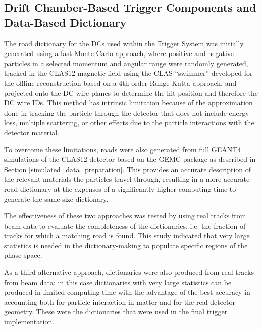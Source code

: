 
\subsection{Drift Chamber-Based Trigger Components and Data-Based Dictionary}
\label{dc_dictionary}

The road dictionary for the DCs used within the Trigger System was initially generated using a fast Monte Carlo approach, where positive and negative particles in a selected momentum and angular range were randomly generated, tracked in the CLAS12 magnetic field using the CLAS ``swimmer'' developed for the offline reconstruction based on a 4th-order Runge-Kutta approach, and projected onto the DC wire planes to determine the hit position and therefore the DC wire IDs. This method has intrinsic limitation because of the approximation done in tracking the particle through the detector that does not include energy loss, multiple scattering, or other effects due to the particle interactions with the detector material.

To overcome these limitations, roads were also generated from full GEANT4 simulations of the CLAS12 detector based on the GEMC package as described in Section \ref{simulated_data_preparation}. This provides an accurate description of the relevant materials the particles travel through, resulting in a more accurate road dictionary at the expenses of a significantly higher computing time to generate the same size dictionary.

The effectiveness of these two approaches was tested by using real tracks from beam data to evaluate the completeness of the dictionaries, i.e. the fraction of tracks for which a matching road is found. This study indicated that very large statistics is needed in the dictionary-making to populate specific regions of the phase space.

As a third alternative approach, dictionaries were also produced from real tracks from beam data: in this case dictionaries with very large statistics can be produced in limited computing time with the advantage of the best accuracy in accounting both for particle interaction in matter and for the real detector geometry. These were the dictionaries that were used in the final trigger implementation.

